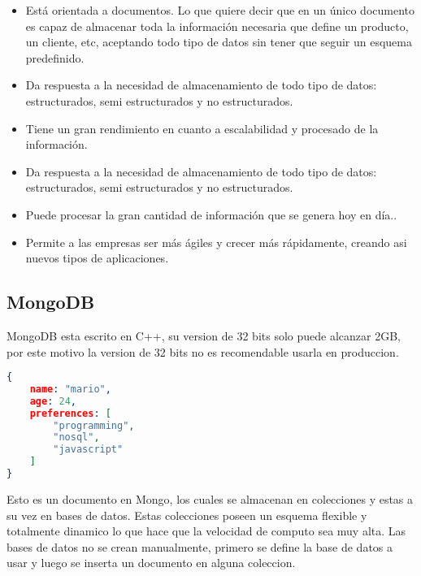 \begin{itemize}

    \item Está orientada a documentos. Lo que quiere decir que en un único documento es capaz de almacenar toda la información necesaria que define un producto, un cliente, etc, aceptando todo tipo de datos sin tener que seguir un esquema predefinido.
    
    \item Da respuesta a la necesidad de almacenamiento de todo tipo de datos: estructurados, semi estructurados y no estructurados. 
    
    \item Tiene un gran rendimiento en cuanto a escalabilidad y procesado de la información.
    
    \item Da respuesta a la necesidad de almacenamiento de todo tipo de datos: estructurados, semi estructurados y no estructurados. 
    
    \item Puede procesar la gran cantidad de información que se genera hoy en día..
    
    \item Permite a las empresas ser más ágiles y crecer más rápidamente, creando asi nuevos tipos de aplicaciones.
    
    
\end{itemize}

\subsection{MongoDB}

MongoDB esta escrito en C++, su version de 32 bits solo puede alcanzar 2GB, por este motivo la version de 32 bits no es recomendable usarla en produccion.
\begin{lstlisting}[language=JSON] 
{
    name: "mario",
    age: 24,
    preferences: [
        "programming",
        "nosql",
        "javascript"
    ]
}

\end{lstlisting}


Esto es un documento en Mongo, los cuales se almacenan en colecciones y estas a su vez en bases de datos. Estas colecciones poseen un esquema flexible y totalmente dinamico lo que hace que la velocidad de computo sea muy alta. Las bases de datos no se crean manualmente, primero se define la base de datos a usar y luego se inserta un documento en alguna coleccion.

